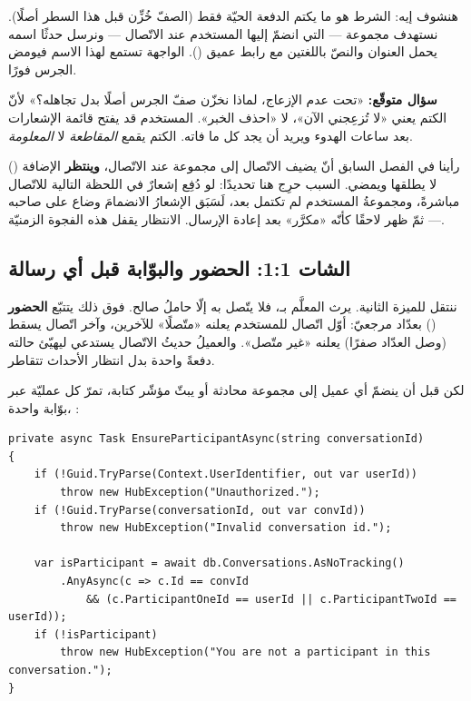هنشوف إيه: الشرط  هو ما يكتم الدفعة الحيّة فقط (الصفّ خُزِّن قبل
هذا السطر أصلًا). نستهدف مجموعة  — التي انضمّ إليها المستخدم عند
الاتّصال — ونرسل حدثًا اسمه  يحمل العنوان والنصّ باللغتين مع
رابط عميق (). الواجهة تستمع لهذا الاسم فيومض الجرس فورًا.

\begin{qa}
\textbf{سؤال متوقّع:} «تحت عدم الإزعاج، لماذا نخزّن صفّ الجرس أصلًا بدل تجاهله؟» لأنّ
الكتم يعني «لا تُزعِجني الآن»، لا «احذف الخبر». المستخدم قد يفتح قائمة الإشعارات بعد
ساعات الهدوء ويريد أن يجد كل ما فاته. الكتم يقمع \emph{المقاطعة} لا \emph{المعلومة}.
\end{qa}

\begin{keyp}
رأينا في الفصل السابق أنّ  يضيف الاتّصال إلى مجموعة
 عند الاتّصال، \textbf{وينتظر} الإضافة () لا يطلقها
ويمضي. السبب حرِج هنا تحديدًا: لو دُفِع إشعارٌ في اللحظة التالية للاتّصال مباشرةً،
ومجموعةُ المستخدم لم تكتمل بعد، لَسَبَق الإشعارُ الانضمامَ وضاع على صاحبه — ثمّ ظهر
لاحقًا كأنّه «مكرَّر» بعد إعادة الإرسال. الانتظار يقفل هذه الفجوة الزمنيّة.
\end{keyp}

\subsection{الشات 1:1: الحضور والبوّابة قبل أي رسالة}

ننتقل للميزة الثانية.  يرث  المعلَّم
بـ\code{[Authorize]}، فلا يتّصل به إلّا حاملُ  صالح. فوق ذلك يتتبّع
\textbf{الحضور} () بعدّاد مرجعيّ: أوّل اتّصال للمستخدم يعلنه
«متّصلًا» للآخرين، وآخر اتّصال يسقط (وصل العدّاد صفرًا) يعلنه «غير متّصل». والعميلُ
حديثُ الاتّصال يستدعي  ليهيّئ حالته دفعةً واحدة بدل انتظار
الأحداث تتقاطر.

لكن قبل أن ينضمّ أي عميل إلى مجموعة محادثة أو يبثّ مؤشّر كتابة، تمرّ كل عمليّة عبر
بوّابة واحدة، :

\begin{english}
\begin{lstlisting}[language={[Sharp]C}]
private async Task EnsureParticipantAsync(string conversationId)
{
    if (!Guid.TryParse(Context.UserIdentifier, out var userId))
        throw new HubException("Unauthorized.");
    if (!Guid.TryParse(conversationId, out var convId))
        throw new HubException("Invalid conversation id.");

    var isParticipant = await db.Conversations.AsNoTracking()
        .AnyAsync(c => c.Id == convId
            && (c.ParticipantOneId == userId || c.ParticipantTwoId == userId));
    if (!isParticipant)
        throw new HubException("You are not a participant in this conversation.");
}
\end{lstlisting}
\end{english}

